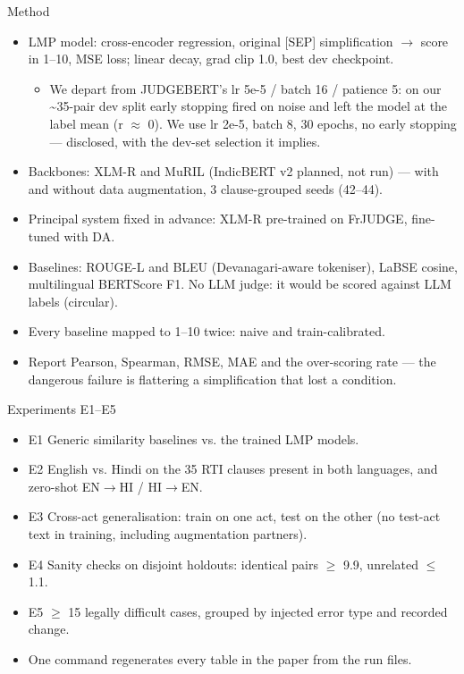 \documentclass[aspectratio=169,11pt]{beamer}
\begin{document}
\begin{frame}{Method}
\footnotesize
\begin{itemize}
\item LMP model: cross-encoder regression, original [SEP] simplification \ensuremath{\rightarrow} score in 1–10, MSE loss; linear decay, grad clip 1.0, best dev checkpoint.
\begin{itemize}\footnotesize
\item We depart from JUDGEBERT's lr 5e-5 / batch 16 / patience 5: on our \textasciitilde{}35-pair dev split early stopping fired on noise and left the model at the label mean (r \ensuremath{\approx} 0). We use lr 2e-5, batch 8, 30 epochs, no early stopping — disclosed, with the dev-set selection it implies.
\end{itemize}
\item Backbones: XLM-R and MuRIL (IndicBERT v2 planned, not run) — with and without data augmentation, 3 clause-grouped seeds (42–44).
\item Principal system fixed in advance: XLM-R pre-trained on FrJUDGE, fine-tuned with DA.
\item Baselines: ROUGE-L and BLEU (Devanagari-aware tokeniser), LaBSE cosine, multilingual BERTScore F1. No LLM judge: it would be scored against LLM labels (circular).
\item Every baseline mapped to 1–10 twice: naive and train-calibrated.
\item Report Pearson, Spearman, RMSE, MAE and the over-scoring rate — the dangerous failure is flattering a simplification that lost a condition.
\end{itemize}
\end{frame}

\begin{frame}{Experiments E1–E5}
\small
\begin{itemize}
\item E1  Generic similarity baselines vs. the trained LMP models.
\item E2  English vs. Hindi on the 35 RTI clauses present in both languages, and zero-shot EN\ensuremath{\rightarrow}HI / HI\ensuremath{\rightarrow}EN.
\item E3  Cross-act generalisation: train on one act, test on the other (no test-act text in training, including augmentation partners).
\item E4  Sanity checks on disjoint holdouts: identical pairs \ensuremath{\geq} 9.9, unrelated \ensuremath{\leq} 1.1.
\item E5  \ensuremath{\geq} 15 legally difficult cases, grouped by injected error type and recorded change.
\item One command regenerates every table in the paper from the run files.
\end{itemize}
\end{frame}
\end{document}
